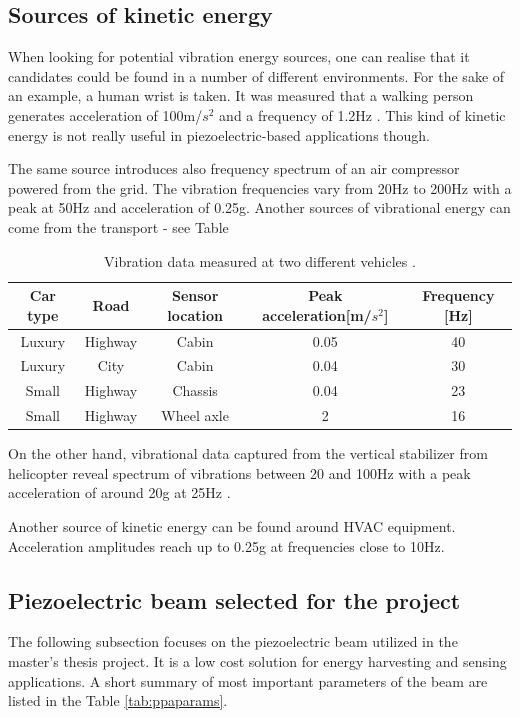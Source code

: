 \documentclass[12pt,a4paper]{article}
\begin{document}
\subsection{Sources of kinetic energy}

When looking for potential vibration energy sources, one can realise that it candidates could be found in a number of different environments. For the sake of an example, a human wrist is taken. It was measured that a walking person generates acceleration of 100m/$s^2$ and a frequency of 1.2Hz \cite{EnHv1}. This kind of kinetic energy is not really useful in piezoelectric-based applications though.
\par
The same source \cite{EnHv1} introduces also frequency spectrum of an air compressor powered from the grid. The vibration frequencies vary from 20Hz to 200Hz with a peak at 50Hz and acceleration of 0.25g.
Another sources of vibrational energy can come from the transport - see Table 

\begin{table}[ht!]
\begin{tabular}{|c|c|c|c|c|}
\hline
\textbf{Car type} & \textbf{Road} & \textbf{Sensor location} & \textbf{Peak acceleration}[m/$s^2$] & \textbf{Frequency} [Hz] \\ \hline
Luxury & Highway & Cabin & 0.05 & 40 \\ \hline
Luxury & City & Cabin & 0.04 & 30 \\ \hline
Small & Highway & Chassis & 0.04 & 23 \\ \hline
Small & Highway & Wheel axle & 2 & 16 \\ \hline
\end{tabular}
\caption{Vibration data measured at two different vehicles \cite{EnHv1}.}
\label{tab:vibrations}
\end{table}

On the other hand, vibrational data captured from the vertical stabilizer from helicopter reveal spectrum of vibrations between 20 and 100Hz with a peak acceleration of around 20g at 25Hz \cite{EnHv1}.
\par
Another source of kinetic energy can be found around HVAC equipment. Acceleration amplitudes reach up to 0.25g at frequencies close to 10Hz.

\subsection{Piezoelectric beam selected for the project}

The following subsection focuses on the piezoelectric beam utilized in the master's thesis project. It is a low cost solution for energy harvesting and sensing applications. A short summary of most important parameters of the beam are listed in the Table \ref{tab:ppaparams}.
\end{document}
